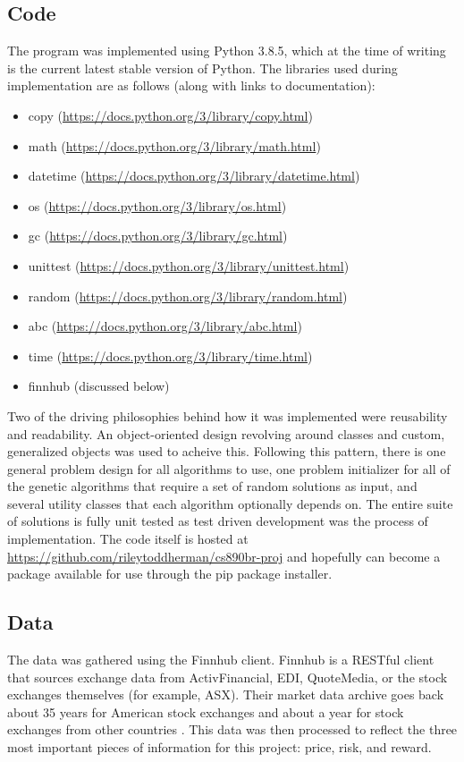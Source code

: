 \documentclass{article}
\begin{document}
    \subsection{Code}
    The program was implemented using Python 3.8.5, which at the time of writing is the current latest stable version of Python. The libraries used during 
    implementation are as follows (along with links to documentation):
    \begin{itemize}
        \item copy (\url{https://docs.python.org/3/library/copy.html})
        \item math (\url{https://docs.python.org/3/library/math.html})
        \item datetime (\url{https://docs.python.org/3/library/datetime.html})
        \item os (\url{https://docs.python.org/3/library/os.html})
        \item gc (\url{https://docs.python.org/3/library/gc.html})
        \item unittest (\url{https://docs.python.org/3/library/unittest.html})
        \item random (\url{https://docs.python.org/3/library/random.html})
        \item abc (\url{https://docs.python.org/3/library/abc.html})
        \item time (\url{https://docs.python.org/3/library/time.html})
        \item finnhub (discussed below)
    \end{itemize}
    Two of the driving philosophies behind how it was implemented were reusability and readability. An object-oriented design revolving around classes and 
    custom, generalized objects was used to acheive this. Following this pattern, there is one general problem design for all algorithms to use, one 
    problem initializer for all of the genetic algorithms that require a set of random solutions as input, and several utility classes that each algorithm
    optionally depends on. \cite{ReillyRalstonHemmendinger} The entire suite of solutions is fully unit tested as test driven development was the process of implementation. \cite{Beck} The code itself 
    is hosted at \url{https://github.com/rileytoddherman/cs890br-proj} and hopefully can become a package available for use through the pip package installer.
    \subsection{Data}
    The data was gathered using the Finnhub client. Finnhub is a RESTful client that sources exchange data from ActivFinancial, EDI, QuoteMedia, or the stock 
    exchanges themselves (for example, ASX). Their market data archive goes back about 35 years for American stock exchanges and about a year for stock exchanges
    from other countries \cite{Finnhub} \cite{Allamaraju}. This data was then processed to reflect the three most important pieces of information for this project: 
    price, risk, and reward.
\end{document}
